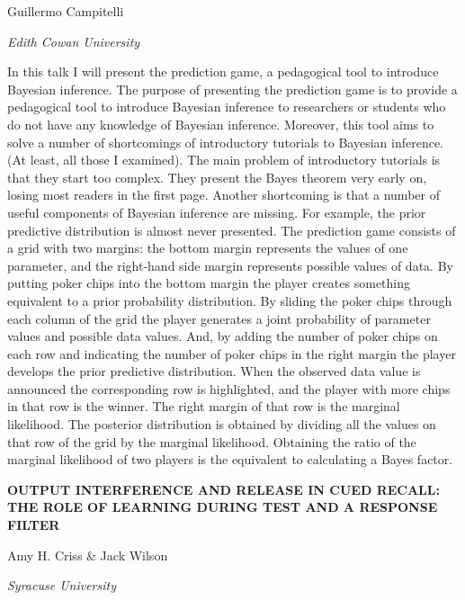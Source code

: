 \documentclass[]{article}
\begin{document}
Guillermo Campitelli

\emph{Edith Cowan University }

In this talk I will present the prediction game, a pedagogical tool to
introduce Bayesian inference. The purpose of presenting the prediction
game is to provide a pedagogical tool to introduce Bayesian inference to
researchers or students who do not have any knowledge of Bayesian
inference. Moreover, this tool aims to solve a number of shortcomings of
introductory tutorials to Bayesian inference. (At least, all those I
examined). The main problem of introductory tutorials is that they start
too complex. They present the Bayes theorem very early on, losing most
readers in the first page. Another shortcoming is that a number of
useful components of Bayesian inference are missing. For example, the
prior predictive distribution is almost never presented. The prediction
game consists of a grid with two margins: the bottom margin represents
the values of one parameter, and the right-hand side margin represents
possible values of data. By putting poker chips into the bottom margin
the player creates something equivalent to a prior probability
distribution. By sliding the poker chips through each column of the grid
the player generates a joint probability of parameter values and
possible data values. And, by adding the number of poker chips on each
row and indicating the number of poker chips in the right margin the
player develops the prior predictive distribution. When the observed
data value is announced the corresponding row is highlighted, and the
player with more chips in that row is the winner. The right margin of
that row is the marginal likelihood. The posterior distribution is
obtained by dividing all the values on that row of the grid by the
marginal likelihood. Obtaining the ratio of the marginal likelihood of
two players is the equivalent to calculating a Bayes factor.

\textbf{OUTPUT INTERFERENCE AND RELEASE IN CUED RECALL: THE ROLE OF
LEARNING DURING TEST AND A RESPONSE FILTER}

Amy H. Criss \& Jack Wilson

\emph{Syracuse University}
\end{document}

